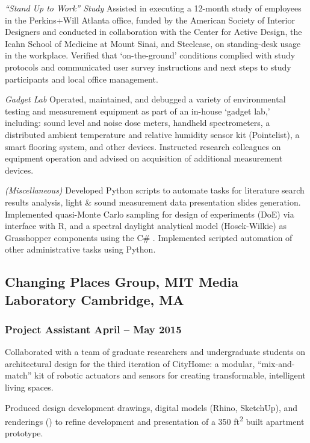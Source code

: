 \documentclass[letterpaper, oneside, 10pt]{article}
\begin{document}
\textit{``Stand Up to Work'' Study}\DotSep{0.25em}
Assisted in executing a 12-month study of employees in the Perkins+Will
Atlanta office, funded by the American Society of Interior Designers
 and conducted in collaboration with the Center for
Active Design, the Icahn School of Medicine at Mount Sinai, and Steelcase,
on standing-desk usage in the workplace. Verified that `on-the-ground'
conditions complied with study protocols and communicated user survey
instructions and next steps to study participants and local office
management.

\textit{Gadget Lab}\DotSep{0.25em}
Operated, maintained, and debugged a variety of environmental testing and
measurement equipment as part of an in-house ‘gadget lab,’ including:
sound level and noise dose meters, handheld spectrometers, a distributed
ambient temperature and relative humidity sensor kit (Pointelist), a
smart flooring system, and other devices. Instructed research colleagues
on equipment operation and advised on acquisition of additional
measurement devices.

\textit{(Miscellaneous)}\DotSep{0.25em}
Developed Python scripts to automate tasks for literature search results
analysis, light \& sound measurement data presentation slides generation.
Implemented quasi-Monte Carlo sampling for design of experiments (DoE) via
interface with R, and a spectral daylight analytical model (Hosek-Wilkie)
as Grasshopper components using the C\# . Implemented
scripted automation of other administrative tasks using Python.


\subsection*{Changing Places Group, MIT Media Laboratory\DotSep{0.25em} Cambridge, MA}

\subsubsection*{Project Assistant\DotSep{0.25em} April -- May 2015}

Collaborated with a team of graduate researchers and undergraduate
students on architectural design for the third iteration of CityHome: a
modular, ``mix-and-match'' kit of robotic actuators and sensors for
creating transformable, intelligent living spaces.

Produced design development drawings, digital models (Rhino, SketchUp),
and renderings (\kern-0.5pt) to refine development and
presentation of a 350 ft\textsuperscript{2} built apartment prototype.
\end{document}
